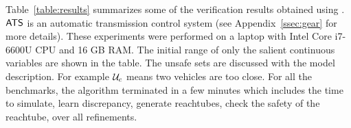 Table~\ref{table:results} summarizes some of the verification results obtained using \toolname. ${\operatorname{\mathsf{ATS}}}$ is an automatic
transmission control system (see Appendix~\ref{ssec:gear} for more details). These experiments were
performed on a laptop with Intel Core i7-6600U CPU and 16 GB RAM. 
%
The initial range of only the salient continuous variables are shown in the table.  The unsafe sets are discussed with the model description. For example ${\mathcal U}_c$ means  two vehicles are too close.
%
%
For all the benchmarks, the algorithm terminated in a few minutes which includes the time to simulate, learn discrepancy, generate reachtubes, check the safety of the reachtube, over all refinements.

